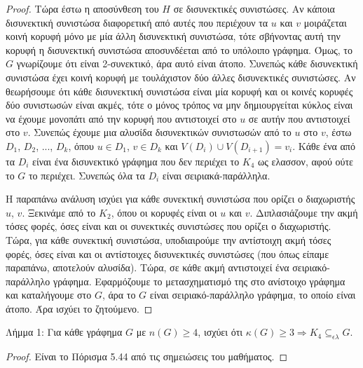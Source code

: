 \documentclass[a4paper, oneside, 11pt]{article}
\theoremstyle{definition}
\begin{document}
\begin{enumerate}
\begin{proof}
Τώρα έστω η αποσύνθεση του $H$ σε δισυνεκτικές συνιστώσες. Αν κάποια δισυνεκτική συνιστώσα διαφορετική από αυτές που περιέχουν τα $u$ και $v$ μοιράζεται κοινή κορυφή μόνο με μία άλλη δισυνεκτική
συνιστώσα, τότε σβήνοντας αυτή την κορυφή η δισυνεκτική συνιστώσα αποσυνδέεται από το υπόλοιπο γράφημα. Όμως, το $G$ γνωρίζουμε ότι είναι 2-συνεκτικό, άρα αυτό είναι άτοπο. Συνεπώς κάθε δισυνεκτική
συνιστώσα έχει κοινή κορυφή με τουλάχιστον δύο άλλες δισυνεκτικές συνιστώσες. Αν θεωρήσουμε ότι κάθε δισυνεκτική συνιστώσα είναι μία κορυφή και οι κοινές κορυφές δύο συνιστωσών είναι ακμές, τότε ο
μόνος τρόπος να μην δημιουργείται κύκλος είναι να έχουμε μονοπάτι από την κορυφή που αντιστοιχεί στο $u$ σε αυτήν που αντιστοιχεί στο $v$. Συνεπώς έχουμε μια αλυσίδα δισυνεκτικών συνιστωσών από το $u$ στο $v$, έστω $D_1$, $D_2$, ..., $D_k$, όπου $u\in D_1$, $v\in D_k$ και $V(D_i)\cup V(D_{i+1}) = v_i$. Κάθε ένα από τα $D_i$ είναι ένα δισυνεκτικό γράφημα που δεν περιέχει το $K_4$ ως ελασσον, αφού 
ούτε το $G$ το περιέχει. Συνεπώς όλα τα $D_i$ είναι σειριακά-παράλληλα.

Η παραπάνω ανάλυση ισχύει για κάθε συνεκτική συνιστώσα που ορίζει ο διαχωριστής $u$, $v$. Ξεκινάμε από το $K_2$, όπου οι κορυφές είναι οι $u$ και $v$. Διπλασιάζουμε την ακμή τόσες φορές, όσες είναι
και οι συνεκτικές συνιστώσες που ορίζει ο διαχωριστής. Τώρα, για κάθε συνεκτική συνιστώσα, υποδιαιρούμε την αντίστοιχη ακμή τόσες φορές, όσες είναι και οι αντίστοιχες δισυνεκτικές συνιστώσες (που όπως είπαμε
παραπάνω, αποτελούν αλυσίδα). Τώρα, σε κάθε ακμή αντιστοιχεί ένα σειριακό-παράλληλο γράφημα. Εφαρμόζουμε το μετασχηματισμό της στο ανίστοιχο γράφημα και καταλήγουμε στο $G$, άρα το $G$ είναι 
σειριακό-παράλληλο γράφημα, το οποίο είναι άτοπο. Άρα ισχύει το ζητούμενο.
	\end{proof}     
Λήμμα 1: Για κάθε γράφημα $G$ με $n(G)\geq 4$, ισχύει ότι $\kappa(G)\geq 3 \Rightarrow K_4 \subseteq_{\epsilon\lambda} G$.
	\begin{proof}
Είναι το Πόρισμα 5.44 από τις σημειώσεις του μαθήματος.
	\end{proof}
 
\end{enumerate}
\end{document}
